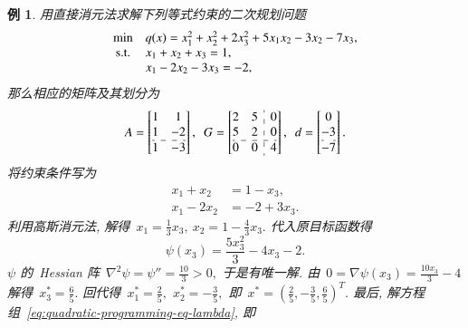 \documentclass{SBCbookchapter}
\newtheorem{exam}[thm]{例}
\numberwithin{equation}{section}
\begin{document}
\begin{exam}\label{eg:7.2.1}
用直接消元法求解下列等式约束的二次规划问题
\begin{equation*}
\begin{array}{cl}
\min & q({x}) = x_1^2 + x_2^2 + 2x_3^2 + 5x_1x_2 - 3x_2 - 7x_3, \\
{\rm s.t.} & x_1 + x_2 + x_3 = 1, \\
& x_1 - 2x_2 - 3x_3 = -2,
\end{array}
\end{equation*}
那么相应的矩阵及其划分为
\begin{equation*}
A = \left[\begin{array}{@{}cc@{}} 1 & 1 \\ 1 & -2 \\ \hdashline 1 & -3 \end{array}\right], ~~ G = \left[\begin{array}{@{}cc:c@{}} 2 & 5 & 0 \\ 5 & 2 & 0 \\ \hdashline 0 & 0 & 4 \end{array}\right], ~~ {d} = \left[\begin{array}{@{}c@{}} 0 \\ -3 \\ \hdashline -7 \end{array}\right].
\end{equation*}
将约束条件写为
\begin{equation*}
\begin{aligned}
x_1 + x_2 & = 1 - x_3, \\
x_1 - 2x_2 & = -2 + 3x_3.
\end{aligned}
\end{equation*}
利用高斯消元法, 解得~$x_1 = \frac{1}{3} x_3, ~ x_2 = 1 - \frac{4}{3} x_3.$ 代入原目标函数得
\begin{equation*}
\psi(x_3) = \frac{5 x_{3}^{2}}{3} - 4 x_{3} - 2.
\end{equation*}
$\psi$ 的~{\rm Hessian} 阵~$\nabla^2 \psi = \psi'' = \frac{10}{3} > 0,$ 于是有唯一解. 由~$0 = \nabla \psi (x_3) = \frac{10 x_{3}}{3} - 4$ 解得~$x_3^* = \frac{6}{5}.$ 回代得~$x_1^* = \frac{2}{5},$ $x_2^* = -\frac{3}{5},$ 即~${x}^* = \left( \frac{2}{5}, -\frac{3}{5}, \frac{6}{5} \right)^T.$ 最后, 解方程组~\eqref{eq:quadratic-programming-eq-lambda}, 即
\begin{equation*}

\end{equation*}
\end{exam}
\end{document}
